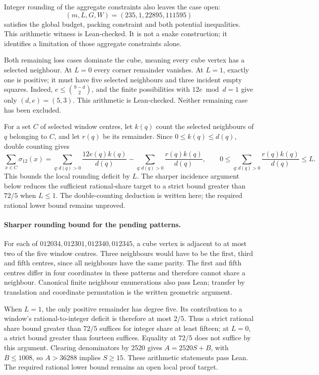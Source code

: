 \documentclass[11pt,a4paper]{article}
\begin{document}
Integer rounding of the aggregate constraints also leaves the case open:
\[
(m,L,G,W)=(235,1,22895,111595)
\]
satisfies the global budget, packing constraint and both potential
inequalities. This arithmetic witness is Lean-checked. It is not a
snake construction; it identifies a limitation of those aggregate
constraints alone.

Both remaining loss cases dominate the cube, meaning every cube vertex
has a selected neighbour. At $L=0$ every corner
remainder vanishes. At $L=1$, exactly one is positive; it must have
five selected neighbours and three incident empty squares. Indeed,
$e\le\binom{9-d}{2}$, and the finite possibilities with
$12e\bmod d=1$ give only $(d,e)=(5,3)$. This arithmetic is Lean-checked.
Neither remaining case has been excluded.

For a set $C$ of selected window centres, let $k(q)$ count the selected
neighbours of $q$ belonging to $C$, and let $r(q)$ be its remainder.
Since $0\le k(q)\le d(q)$, double counting gives
\[
\sum_{x\in C}\sigma_{12}(x)
=\sum_{q:d(q)>0}\frac{12e(q)k(q)}{d(q)}
-\sum_{q:d(q)>0}\frac{r(q)k(q)}{d(q)},
\qquad
0\le\sum_{q:d(q)>0}\frac{r(q)k(q)}{d(q)}\le L.
\]
This bounds the local rounding deficit by $L$. The sharper incidence
argument below reduces the sufficient rational-share target to a
strict bound greater than $72/5$ when $L\le1$. The double-counting
deduction is written here; the required rational lower bound remains unproved.

\paragraph{Sharper rounding bound for the pending patterns.}
For each of $012034,012301,012340,012345$, a cube vertex is adjacent to
at most two of the five window centres. Three neighbours would have to
be the first, third and fifth centres, since all neighbours have the same
parity. The first and fifth centres differ in four coordinates in these
patterns and therefore cannot share a neighbour. Canonical finite
neighbour enumerations also pass Lean; transfer by translation and
coordinate permutation is the written geometric argument.

When $L=1$, the only positive remainder has degree five. Its contribution
to a window's rational-to-integer deficit is therefore at most $2/5$.
Thus a strict rational share bound greater than $72/5$ suffices for
integer share at least fifteen; at $L=0$, a strict bound greater than
fourteen suffices. Equality at $72/5$ does not suffice by this argument.
Clearing denominators by 2520 gives $A=2520S+B$, with $B\le1008$,
so $A>36288$ implies $S\ge15$. These arithmetic statements pass Lean.
The required rational lower bound remains an open local proof target.
\end{document}
